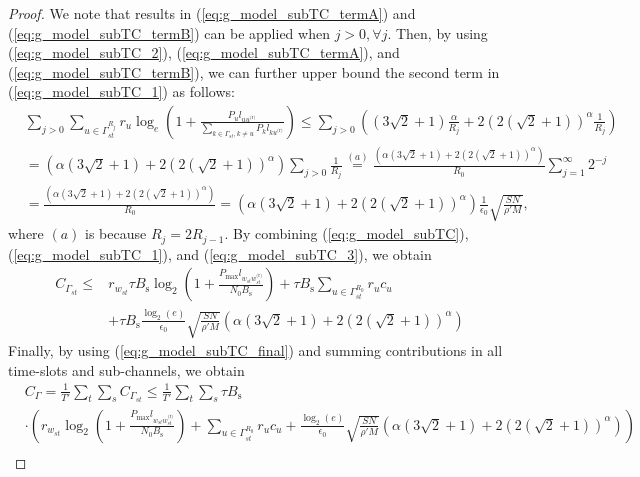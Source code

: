 \documentclass[journal,draftclsnofoot,onecolumn,12pt,twoside]{IEEEtran}
\begin{document}
\begin{proof}
We note that results in (\ref{eq:g_model_subTC_termA}) and (\ref{eq:g_model_subTC_termB}) can be applied when $j>0,\forall j$. Then, by using (\ref{eq:g_model_subTC_2}), (\ref{eq:g_model_subTC_termA}), and (\ref{eq:g_model_subTC_termB}), we can further upper bound the second term in (\ref{eq:g_model_subTC_1}) as follows:
\begin{equation}
\begin{aligned}\label{eq:g_model_subTC_3}
&\sum_{j>0}\sum_{u\in\Gamma_{st}^{R_j}}r_u\log_e\left(1+\frac{P_ul_{uu^{\text{(r)}}}}{\sum_{k\in\Gamma_{st},k\neq u}P_kl_{ku^{\text{(r)}}}}\right)\leq\sum_{j>0}\left(\left(3\sqrt{2}+1\right)\frac{\alpha}{R_j}+2(2(\sqrt{2}+1))^{\alpha}\frac{1}{R_j}\right)\\
&=\left(\alpha\left(3\sqrt{2}+1\right)+2(2(\sqrt{2}+1))^{\alpha}\right)\sum_{j>0}\frac{1}{R_j}\stackrel{(a)}{=}\frac{\left(\alpha\left(3\sqrt{2}+1\right)+2(2(\sqrt{2}+1))^{\alpha}\right)}{R_0}\sum_{j=1}^{\infty}2^{-j}\\
&=\frac{\left(\alpha\left(3\sqrt{2}+1\right)+2(2(\sqrt{2}+1))^{\alpha}\right)}{R_0}=\left(\alpha\left(3\sqrt{2}+1\right)+2(2(\sqrt{2}+1))^{\alpha}\right)\frac{1}{\epsilon_0}\sqrt{\frac{SN}{\rho'M}},
\end{aligned}
\end{equation}
where $(a)$ is because $R_j=2R_{j-1}$. By combining (\ref{eq:g_model_subTC}), (\ref{eq:g_model_subTC_1}), and (\ref{eq:g_model_subTC_3}), we obtain
\begin{equation}
\begin{aligned}\label{eq:g_model_subTC_final}
C_{\Gamma_{st}}\leq& r_{w_{st}}\tau B_{\text{s}}\log_2\left(1+\frac{P_{\text{max}}l_{w_{st}w_{st}^{\text{(r)}}}}{N_0B_{\text{s}}}\right)+\tau B_{\text{s}}\sum_{u\in\Gamma^{R_0}_{st}}r_uc_u\\
&+\tau B_{\text{s}}\frac{\log_2(e)}{\epsilon_0}\sqrt{\frac{SN}{\rho'M}}\left(\alpha\left(3\sqrt{2}+1\right)+2(2(\sqrt{2}+1))^{\alpha}\right)
\end{aligned}
\end{equation}
Finally, by using (\ref{eq:g_model_subTC_final}) and summing contributions in all time-slots and sub-channels, we obtain
\begin{equation}
\begin{aligned}\label{eq:g_model_TC}
&C_{\Gamma}=\frac{1}{T'}\sum_{t}\sum_{s}C_{\Gamma_{st}}\leq \frac{1}{T'}\sum_{t}\sum_{s}\tau B_{\text{s}}\\
&\cdot\left(r_{w_{st}}\log_2\left(1+\frac{P_{\text{max}}l_{w_{st}w_{st}^{\text{(r)}}}}{N_0B_{\text{s}}}\right)+\sum_{u\in\Gamma^{R_0}_{st}}r_uc_u+\frac{\log_2(e)}{\epsilon_0}\sqrt{\frac{SN}{\rho'M}}\left(\alpha\left(3\sqrt{2}+1\right)+2(2(\sqrt{2}+1))^{\alpha}\right)\right)\\

\end{aligned}
\end{equation}
\end{proof}
\end{document}
